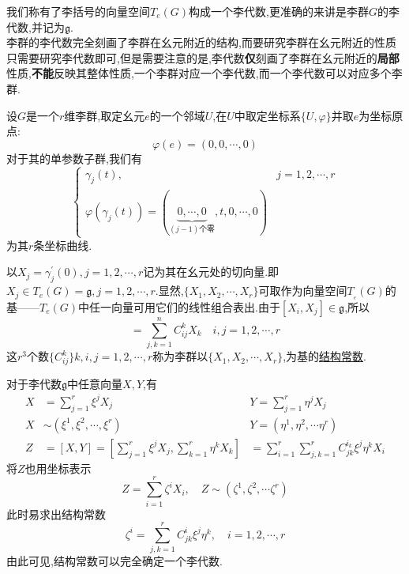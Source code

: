 我们称有了李括号的向量空间$T_e(G)$构成一个李代数,更准确的来讲是李群$G$的李代数,并记为$\mathfrak{g}$.\\
李群的李代数完全刻画了李群在幺元附近的结构,而要研究李群在幺元附近的性质只需要研究李代数即可,但是需要注意的是,李代数\textbf{仅}刻画了李群在幺元附近的\textbf{局部}性质,\textbf{不能}反映其整体性质,一个李群对应一个李代数,而一个李代数可以对应多个李群.
\begin{definition}[结构常数]
	设$G$是一个$r$维李群,取定幺元$e$的一个邻域$U$,在$U$中取定坐标系$\{U,\varphi\}$并取$e$为坐标原点:
	\begin{equation}
		\varphi(e)=(0,0,\cdots,0)
	\end{equation}
	对于其的单参数子群,我们有
	\begin{equation}
		\begin{cases}\gamma_j(t),&j=1,2,\cdots,r\\\varphi(\gamma_j(t))=(\underbrace{0,\cdots,0}_{(j-1)\text{个零}},t,0,\cdots,0)\end{cases}
	\end{equation}
	为其$r$条坐标曲线.
	
	以$X_{j}= \gamma _{j}^{\prime }(0),j= 1, 2, \cdots , r$记为其在幺元处的切向量.即$X_j\in T_e(G) = \mathfrak{g}, j= 1, 2, \cdots , r$.显然,$\{X_1,X_2,\cdots,X_r\}$可取作为向量空间$T_{_e}(G)$的基——$T_{e}(G)$中任一向量可用它们的线性组合表出.由于$[X_i,X_j]\in \mathfrak{g}$,所以
	\begin{equation}
		[X_{i},X_{j}]=\sum_{j,k=1}^{n}C_{ij}^{k}X_{k}\quad i,j=1,2,\cdots,r
	\end{equation}
	这$r^3$个数$\{C_{ij}^k\}k,i,j=1,2,\cdots,r$称为李群以$\{X_1,X_2,\cdots,X_r\}$,为基的\underline{结构常数}.
\end{definition}
对于李代数$\mathfrak{g}$中任意向量$X,Y$,有
\begin{equation}
	\begin{aligned}
		X&=\sum_{j=1}^{r}\xi^{j}X_{j}&Y=\sum_{j=1}^{r}\eta^{j}X_{j}\\
		X&\sim(\xi^{1},\xi^{2},\cdots,\xi^{r})&Y=(\eta^{1},\eta^{2},\cdots\eta^{r})\\
		Z&=[X,Y]=\left[\sum_{j=1}^{r}\xi^{j}X_{j},\sum_{k=1}^{r}\eta^{k}X_{k}\right]&=\sum_{i=1}^{r}\sum_{j,k=1}^{r}C_{jk}^{i_{k}}\xi^{j}\eta^{k}X_{i}
	\end{aligned}
\end{equation}
将$Z$也用坐标表示
\begin{equation}
	Z=\sum_{i=1}^{r}\zeta^{ i}X_{i},\quad Z\sim(\zeta^{ 1},\zeta^{ 2},\cdots\zeta^{ r})
\end{equation}
此时易求出结构常数
\begin{equation}
	\zeta^{i}=\sum_{j,k=1}^{r}C_{jk}^{i}\xi^{j}\eta^{k},\quad i=1,2,\cdots,r
\end{equation}
由此可见,结构常数可以完全确定一个李代数.

